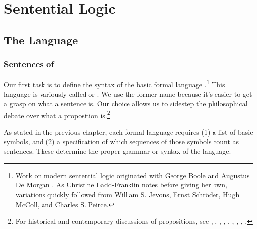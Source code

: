 
\chapter{Sentential Logic}\label{sententiallogic}


\section{The Language \GSL{}}\label{The Language GSL}

\subsection{Sentences of \GSL{}}\label{Sentences of GSL}
Our first task is to define the syntax of the basic formal language \GSL{}.\footnote{Work on modern sentential logic originated with George Boole \citeyearpar{Boole1854} and Augustus De Morgan \citeyearpar{DeMorgan1847,DeMorgan1860}. 
	As Christine Ladd-Franklin notes \citeyearpar[17]{LaddFranklin1883} before giving her own, variations quickly followed from William S. Jevons, Ernst Schr\"oder, Hugh McColl, and Charles S. Peirce.} 
This language is variously called  or . 
We use the former name because it's easier to get a grasp on what a sentence is.
Our choice allows us to sidestep the philosophical debate over what a proposition is.\footnote{For historical and contemporary discussions of propositions, see \citealt{Frege1892}, \citealt[13,47]{Russell1903}, \citealt[26]{Church1956}, \citealt[ch.~1]{Quine1986}, \citealt[ch.~3]{Schiffer1987}, \citealt{Grandy1993}, \citealt{Bealer1998b}, \citealp{King2007}, \citealt{Soames2010}.}

As stated in the previous chapter, each formal language requires (1) a list of basic symbols, and (2) a specification of which sequences of those symbols count as sentences.
These determine the proper grammar or syntax of the language. 

